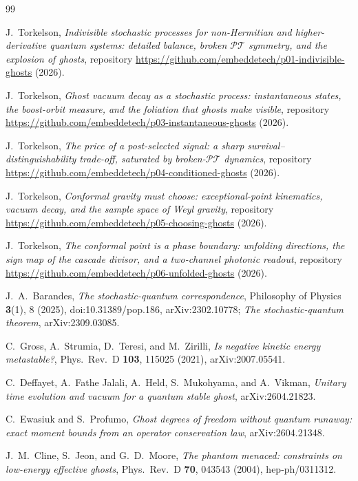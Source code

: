 \documentclass[11pt]{article}
\newcommand{\PT}{\mathcal{PT}}
\begin{document}
\begin{thebibliography}{99}\small

J.~Torkelson,
\emph{Indivisible stochastic processes for non-Hermitian and
higher-derivative quantum systems: detailed balance, broken $\PT$
symmetry, and the explosion of ghosts},
repository \url{https://github.com/embeddetech/p01-indivisible-ghosts}
(2026).

J.~Torkelson,
\emph{Ghost vacuum decay as a stochastic process: instantaneous
states, the boost-orbit measure, and the foliation that ghosts make
visible}, repository
\url{https://github.com/embeddetech/p03-instantaneous-ghosts} (2026).

J.~Torkelson,
\emph{The price of a post-selected signal: a sharp
survival--distinguishability trade-off, saturated by broken-$\PT$
dynamics}, repository
\url{https://github.com/embeddetech/p04-conditioned-ghosts} (2026).

J.~Torkelson,
\emph{Conformal gravity must choose: exceptional-point kinematics,
vacuum decay, and the sample space of Weyl gravity}, repository
\url{https://github.com/embeddetech/p05-choosing-ghosts} (2026).

J.~Torkelson,
\emph{The conformal point is a phase boundary: unfolding
directions, the sign map of the cascade divisor, and a two-channel
photonic readout}, repository
\url{https://github.com/embeddetech/p06-unfolded-ghosts} (2026).

J.~A.~Barandes,
\emph{The stochastic-quantum correspondence},
Philosophy of Physics \textbf{3}(1), 8 (2025),
doi:10.31389/pop.186, arXiv:2302.10778;
\emph{The stochastic-quantum theorem}, arXiv:2309.03085.

C.~Gross, A.~Strumia, D.~Teresi, and M.~Zirilli,
\emph{Is negative kinetic energy metastable?},
Phys.\ Rev.\ D \textbf{103}, 115025 (2021), arXiv:2007.05541.

C.~Deffayet, A.~Fathe Jalali, A.~Held, S.~Mukohyama, and
A.~Vikman,
\emph{Unitary time evolution and vacuum for a quantum stable
ghost},
arXiv:2604.21823.

C.~Ewasiuk and S.~Profumo,
\emph{Ghost degrees of freedom without quantum runaway: exact
moment bounds from an operator conservation law},
arXiv:2604.21348.

J.~M.~Cline, S.~Jeon, and G.~D.~Moore,
\emph{The phantom menaced: constraints on low-energy effective
ghosts},
Phys.\ Rev.\ D \textbf{70}, 043543 (2004), hep-ph/0311312.


\end{thebibliography}
\end{document}
